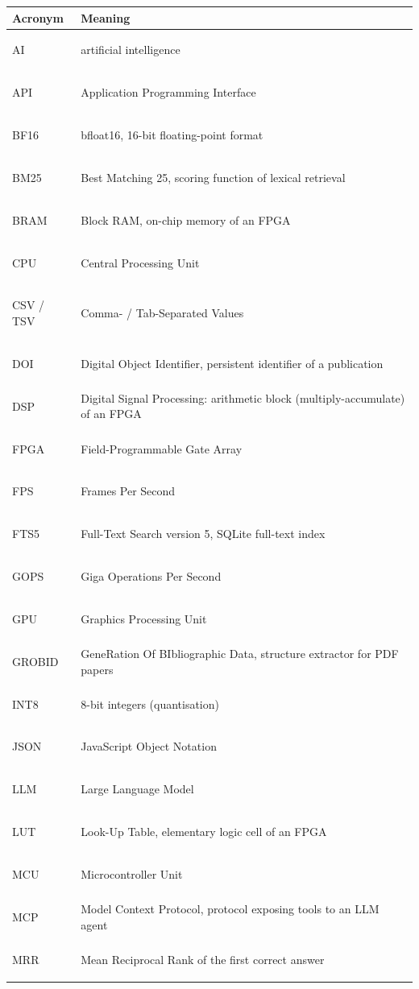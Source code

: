 \documentclass[11pt,a4paper]{article}
\begin{document}
\begin{center}
\small
\begin{tabularx}{\linewidth}{@{}lL@{}}
\toprule
Acronym & Meaning \\
\midrule
\hypertarget{gl:AI}{AI} & artificial intelligence \\
\hypertarget{gl:API}{API} & Application Programming Interface \\
\hypertarget{gl:BF16}{BF16} & bfloat16, 16-bit floating-point format \\
\hypertarget{gl:BM25}{BM25} & Best Matching 25, scoring function of lexical retrieval \\
\hypertarget{gl:BRAM}{BRAM} & Block RAM, on-chip memory of an FPGA \\
\hypertarget{gl:CPU}{CPU} & Central Processing Unit \\
\hypertarget{gl:CSV}{CSV / TSV} & Comma- / Tab-Separated Values \\
\hypertarget{gl:DOI}{DOI} & Digital Object Identifier, persistent identifier of a publication \\
\hypertarget{gl:DSP}{DSP} & Digital Signal Processing: arithmetic block (multiply-accumulate) of an FPGA \\
\hypertarget{gl:FPGA}{FPGA} & Field-Programmable Gate Array \\
\hypertarget{gl:FPS}{FPS} & Frames Per Second \\
\hypertarget{gl:FTS5}{FTS5} & Full-Text Search version 5, SQLite full-text index \\
\hypertarget{gl:GOPS}{GOPS} & Giga Operations Per Second \\
\hypertarget{gl:GPU}{GPU} & Graphics Processing Unit \\
\hypertarget{gl:GROBID}{GROBID} & GeneRation Of BIbliographic Data, structure extractor for PDF papers \\
\hypertarget{gl:INT8}{INT8} & 8-bit integers (quantisation) \\
\hypertarget{gl:JSON}{JSON} & JavaScript Object Notation \\
\hypertarget{gl:LLM}{LLM} & Large Language Model \\
\hypertarget{gl:LUT}{LUT} & Look-Up Table, elementary logic cell of an FPGA \\
\hypertarget{gl:MCU}{MCU} & Microcontroller Unit \\
\hypertarget{gl:MCP}{MCP} & Model Context Protocol, protocol exposing tools to an LLM agent \\
\hypertarget{gl:MRR}{MRR} & Mean Reciprocal Rank of the first correct answer \\

\end{tabularx}
\end{center}
\end{document}
